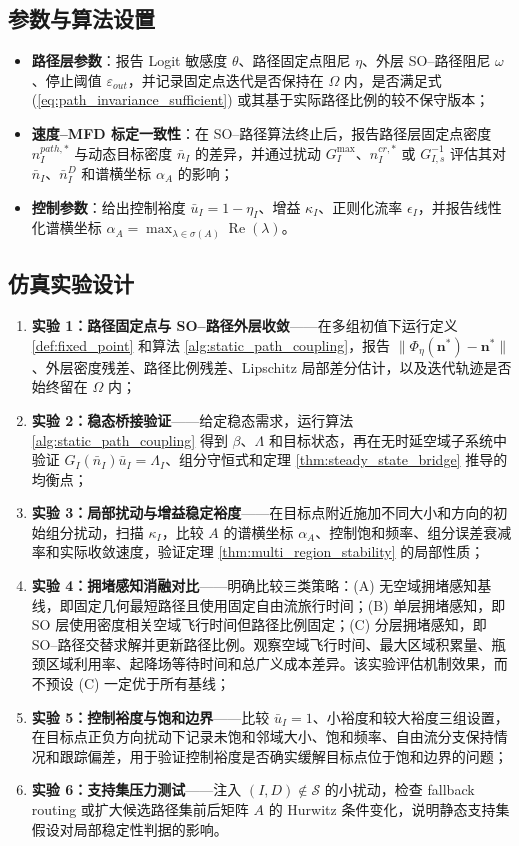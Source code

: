 \documentclass[a4paper,12pt]{article}
\theoremstyle{plain}
\theoremstyle{definition}
\theoremstyle{remark}
\begin{document}
\subsection{参数与算法设置}
\begin{itemize}
    \item \textbf{路径层参数}：报告 Logit 敏感度 $\theta$、路径固定点阻尼 $\eta$、外层 SO--路径阻尼 $\omega$、停止阈值 $\varepsilon_{out}$，并记录固定点迭代是否保持在 $\Omega$ 内，是否满足式 (\ref{eq:path_invariance_sufficient}) 或其基于实际路径比例的较不保守版本；
    \item \textbf{速度--MFD 标定一致性}：在 SO--路径算法终止后，报告路径层固定点密度 $n_I^{path,*}$ 与动态目标密度 $\bar n_I$ 的差异，并通过扰动 $G_I^{\max}$、$n_I^{cr,*}$ 或 $G_{I,s}^{-1}$ 评估其对 $\bar n_I$、$\bar n_I^D$ 和谱横坐标 $\alpha_A$ 的影响；
    \item \textbf{控制参数}：给出控制裕度 $\bar u_I=1-\eta_I$、增益 $\kappa_I$、正则化流率 $\epsilon_I$，并报告线性化谱横坐标 $\alpha_A=\max_{\lambda\in\sigma(A)}\operatorname{Re}(\lambda)$。
\end{itemize}

\subsection{仿真实验设计}
\begin{enumerate}
    \item \textbf{实验 1：路径固定点与 SO--路径外层收敛}——在多组初值下运行定义 \ref{def:fixed_point} 和算法 \ref{alg:static_path_coupling}，报告 $\|\Phi_\eta(\bm n^*)-\bm n^*\|$、外层密度残差、路径比例残差、Lipschitz 局部差分估计，以及迭代轨迹是否始终留在 $\Omega$ 内；
    \item \textbf{实验 2：稳态桥接验证}——给定稳态需求，运行算法 \ref{alg:static_path_coupling} 得到 $\beta$、$\Lambda$ 和目标状态，再在无时延空域子系统中验证 $G_I(\bar n_I)\bar u_I=\Lambda_I$、组分守恒式和定理 \ref{thm:steady_state_bridge} 推导的均衡点；
    \item \textbf{实验 3：局部扰动与增益稳定裕度}——在目标点附近施加不同大小和方向的初始组分扰动，扫描 $\kappa_I$，比较 $A$ 的谱横坐标 $\alpha_A$、控制饱和频率、组分误差衰减率和实际收敛速度，验证定理 \ref{thm:multi_region_stability} 的局部性质；
    \item \textbf{实验 4：拥堵感知消融对比}——明确比较三类策略：(A) 无空域拥堵感知基线，即固定几何最短路径且使用固定自由流旅行时间；(B) 单层拥堵感知，即 SO 层使用密度相关空域飞行时间但路径比例固定；(C) 分层拥堵感知，即 SO--路径交替求解并更新路径比例。观察空域飞行时间、最大区域积累量、瓶颈区域利用率、起降场等待时间和总广义成本差异。该实验评估机制效果，而不预设 (C) 一定优于所有基线；
    \item \textbf{实验 5：控制裕度与饱和边界}——比较 $\bar u_I=1$、小裕度和较大裕度三组设置，在目标点正负方向扰动下记录未饱和邻域大小、饱和频率、自由流分支保持情况和跟踪偏差，用于验证控制裕度是否确实缓解目标点位于饱和边界的问题；
    \item \textbf{实验 6：支持集压力测试}——注入 $(I,D)\notin\mathcal S$ 的小扰动，检查 fallback routing 或扩大候选路径集前后矩阵 $A$ 的 Hurwitz 条件变化，说明静态支持集假设对局部稳定性判据的影响。
\end{enumerate}
\end{document}
